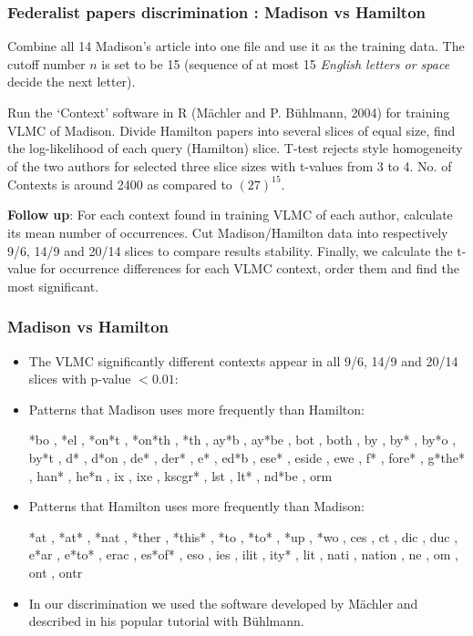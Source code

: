 \documentclass{beamer}
\begin{document}
\begin{frame}
\frametitle{Federalist papers discrimination : Madison vs Hamilton}


Combine all 14 Madison's article into one file and use it as the
training data. The cutoff number $n$ is set to be 15 (sequence of at most 15 {\it English letters or space}
decide the next letter).

\par Run the `Context' software in R (M\"{a}chler and P. B\"{u}hlmann, 2004) for training VLMC of Madison.
Divide Hamilton papers into several
slices of equal size, find the log-likelihood of each query (Hamilton) slice. T-test rejects style homogeneity of the two authors for
selected three slice sizes with t-values from 3 to 4.  No. of Contexts is around 2400 as compared to $(27)^{15}$.


{\bf Follow up}: For each context found in training VLMC of each author, calculate its mean number of occurrences.
Cut Madison/Hamilton data into respectively 9/6, 14/9 and 20/14 slices to compare results stability. Finally, we calculate
the t-value for occurrence differences for each VLMC context, order them and find the most significant.\




\end{frame}
\begin{frame}
\frametitle{Madison vs Hamilton}
\begin{itemize}
\item The VLMC significantly different contexts appear in all 9/6, 14/9 and 20/14 slices with p-value $<0.01$:

\item Patterns that Madison uses more frequently than Hamilton:

*bo , *el , *on*t , *on*th , *th , ay*b , ay*be , bot , both , by , by* , by*o , by*t , d* , d*on , de* , der* , e* , ed*b , ese* , eside , ewe , f* , fore* , g*the* , han* , he*n , ix , ixe , kscgr* , lst , lt* , nd*be , orm



\item Patterns that Hamilton uses more frequently than Madison:

*at , *at* , *nat , *ther , *this* , *to , *to* , *up , *wo , ces , ct , dic , duc , e*ar , e*to* , erac , es*of* , eso , ies , ilit , ity* , lit , nati , nation , ne , om , ont , ontr


\item In our  discrimination we used the software
developed by M\"{a}chler and described in his popular tutorial with B\"{u}hlmann.
\end{itemize}


\end{frame}
\end{document}
